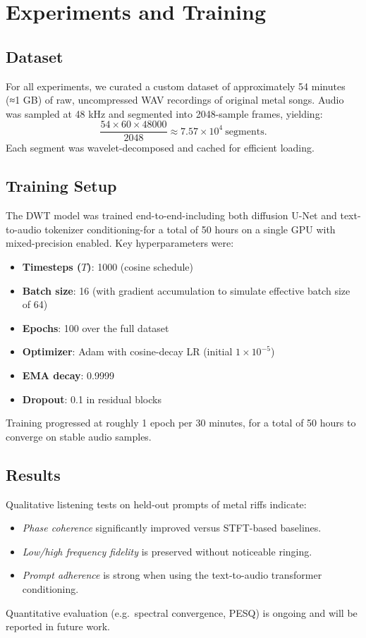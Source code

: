 \documentclass[12pt]{report}
\begin{document}
\chapter{Experiments and Training}

\section{Dataset}
For all experiments, we curated a custom dataset of approximately 54 minutes (≈1 GB) of raw, uncompressed WAV recordings of original metal songs. Audio was sampled at 48 kHz and segmented into 2048-sample frames, yielding:
\[
\frac{54 \times 60 \times 48000}{2048} \approx 7.57\times10^4\ \text{segments}.
\]
Each segment was wavelet-decomposed and cached for efficient loading.

\section{Training Setup}
The DWT model was trained end-to-end-including both diffusion U-Net and text-to-audio tokenizer conditioning-for a total of 50 hours on a single GPU with mixed-precision enabled. Key hyperparameters were:
\begin{itemize}
  \item \textbf{Timesteps ($T$)}: 1000 (cosine schedule)
  \item \textbf{Batch size}: 16 (with gradient accumulation to simulate effective batch size of 64)
  \item \textbf{Epochs}: 100 over the full dataset
  \item \textbf{Optimizer}: Adam with cosine-decay LR (initial $1\times10^{-5}$)
  \item \textbf{EMA decay}: 0.9999
  \item \textbf{Dropout}: 0.1 in residual blocks
\end{itemize}
Training progressed at roughly 1 epoch per 30 minutes, for a total of 50 hours to converge on stable audio samples.

\section{Results}
Qualitative listening tests on held-out prompts of metal riffs indicate:
\begin{itemize}
  \item \emph{Phase coherence} significantly improved versus STFT-based baselines.
  \item \emph{Low/high frequency fidelity} is preserved without noticeable ringing.
  \item \emph{Prompt adherence} is strong when using the text-to-audio transformer conditioning.
\end{itemize}
Quantitative evaluation (e.g.\ spectral convergence, PESQ) is ongoing and will be reported in future work.
\end{document}

